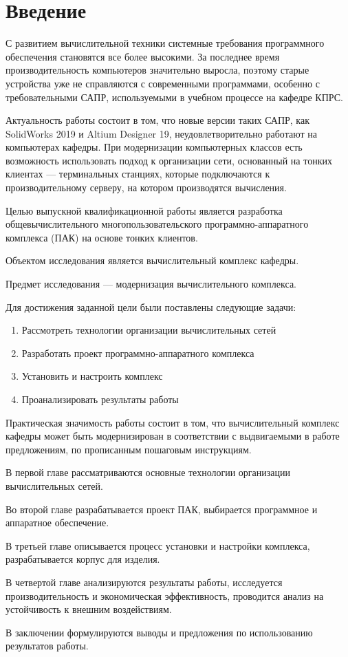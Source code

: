 \chapter*{Введение}

С развитием вычислительной техники системные требования программного обеспечения
становятся все более высокими. За последнее время производительность компьютеров
значительно выросла, поэтому старые устройства уже не справляются с современными
программами, особенно с требовательными САПР, используемыми в учебном процессе
на кафедре КПРС.

Актуальность работы состоит в том, что новые версии таких САПР, как SolidWorks 2019 и
Altium Designer 19, неудовлетворительно работают на компьютерах кафедры.
При модернизации компьютерных классов есть
возможность использовать подход к организации сети, основанный на тонких клиентах —
терминальных станциях, которые подключаются к производительному серверу, на котором
производятся вычисления.

Целью выпускной квалификационной работы является разработка общевычислительного
многопользовательского программно-аппаратного комплекса (ПАК) на основе тонких клиентов.

Объектом исследования является вычислительный комплекс кафедры.

Предмет исследования — модернизация вычислительного комплекса.

Для достижения заданной цели были поставлены следующие задачи:

\begin{enumerate}
    \item Рассмотреть технологии организации вычислительных сетей
    \item Разработать проект программно-аппаратного комплекса
    \item Установить и настроить комплекс
    \item Проанализировать результаты работы
\end{enumerate}

Практическая значимость работы состоит в том, что вычислительный комплекс кафедры может
быть модернизирован в соответствии с выдвигаемыми в работе предложениям, по прописанным
пошаговым инструкциям.

В первой главе рассматриваются основные технологии организации вычислительных сетей.

Во второй главе разрабатывается проект ПАК, выбирается программное и аппаратное
обеспечение.

В третьей главе описывается процесс установки и настройки комплекса, разрабатывается
корпус для изделия.

В четвертой главе анализируются результаты работы, исследуется производительность и
экономическая эффективность, проводится анализ на устойчивость к внешним воздействиям.

В заключении формулируются выводы и предложения по использованию результатов работы.
